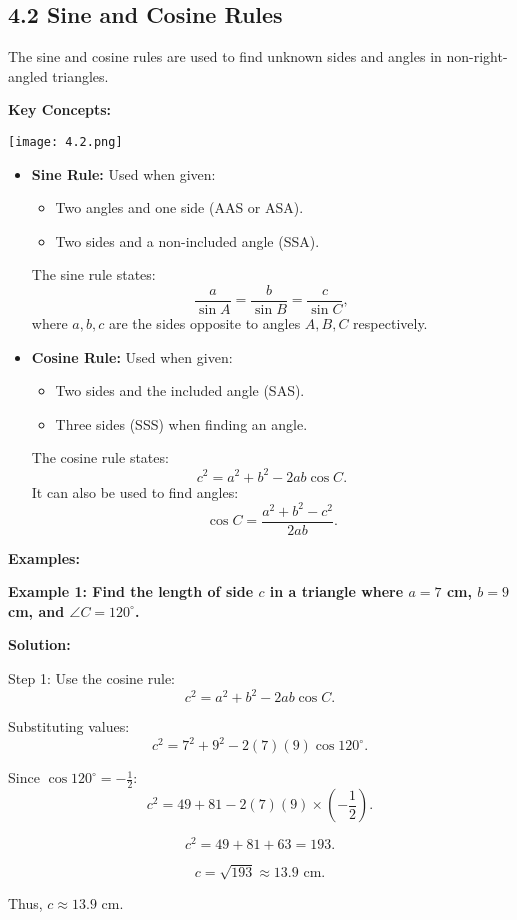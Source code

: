 
\subsection*{4.2 Sine and Cosine Rules}
The sine and cosine rules are used to find unknown sides and angles in non-right-angled triangles.

\textbf{Key Concepts:}

\begin{center}
	\texttt{[image: 4.2.png]}
\end{center}
\begin{itemize}
	\item \textbf{Sine Rule:} Used when given:
	\begin{itemize}
		\item Two angles and one side (AAS or ASA).
		\item Two sides and a non-included angle (SSA).
	\end{itemize}
	The sine rule states:
	\[
	\frac{a}{\sin A} = \frac{b}{\sin B} = \frac{c}{\sin C},
	\]
	where $a, b, c$ are the sides opposite to angles $A, B, C$ respectively.
	
	\item \textbf{Cosine Rule:} Used when given:
	\begin{itemize}
		\item Two sides and the included angle (SAS).
		\item Three sides (SSS) when finding an angle.
	\end{itemize}
	The cosine rule states:
	\[
	c^2 = a^2 + b^2 - 2ab\cos C.
	\]
	It can also be used to find angles:
	\[
	\cos C = \frac{a^2 + b^2 - c^2}{2ab}.
	\]
	
\end{itemize}

\textbf{Examples:}

\begin{flushleft}
	\textbf{Example 1: Find the length of side $c$ in a triangle where $a = 7$ cm, $b = 9$ cm, and $\angle C = 120^\circ$.}
	
	\vspace{0.5cm}
	\textbf{Solution:}
	\vspace{0.5cm}
	
	Step 1: Use the cosine rule:
	\[
	c^2 = a^2 + b^2 - 2ab\cos C.
	\]
	
	Substituting values:
	\[
	c^2 = 7^2 + 9^2 - 2(7)(9)\cos 120^\circ.
	\]
	
	Since $\cos 120^\circ = -\frac{1}{2}$:
	\[
	c^2 = 49 + 81 - 2(7)(9) \times \left(-\frac{1}{2} \right).
	\]
	
	\[
	c^2 = 49 + 81 + 63 = 193.
	\]
	
	\[
	c = \sqrt{193} \approx 13.9 \text{ cm}.
	\]
	
	Thus, $c \approx 13.9$ cm.
\end{flushleft}

